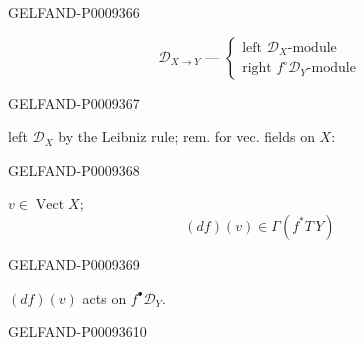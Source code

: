 \begin{GelfandAdjacentEvidence}{GELFAND-P000936}{6}


\begin{equation*}
 \mathcal D_{X\to Y}\text{ --- }
 \left\{\begin{array}{l}
 \text{left } \mathcal D_X\text{-module}\\
 \text{right } f^\circ\mathcal D_Y\text{-module}
 \end{array}\right.
 \tag{25}
\end{equation*}
\end{GelfandAdjacentEvidence}
\begin{GelfandAdjacentEvidence}{GELFAND-P000936}{7}


left $\mathcal D_X$ by the Leibniz rule; rem. for vec. fields on $X$:
\end{GelfandAdjacentEvidence}
\begin{GelfandAdjacentEvidence}{GELFAND-P000936}{8}


$v\in\operatorname{Vect}X$;
\[
 (df)(v)\in\Gamma(f^*T\,Y)
\]
\end{GelfandAdjacentEvidence}
\begin{GelfandAdjacentEvidence}{GELFAND-P000936}{9}


$(df)(v)$ acts on \underline{\underline{$f^\bullet\mathcal D_Y$}}.
\end{GelfandAdjacentEvidence}
\begin{GelfandAdjacentEvidence}{GELFAND-P000936}{10}

\end{GelfandAdjacentEvidence}


